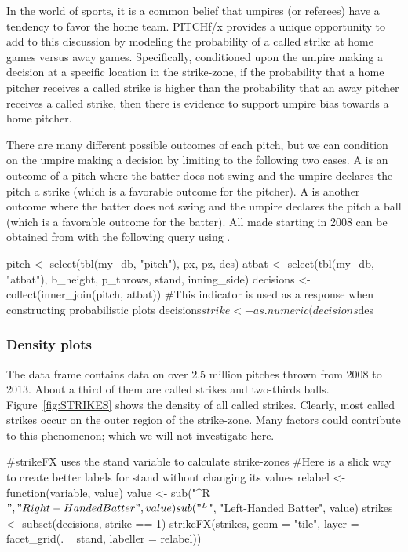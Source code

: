\documentclass[a4paper]{report}\usepackage[]{graphicx}\usepackage[]{color}
\begin{document}
\begin{article}
In the world of sports, it is a common belief that umpires (or referees)
have a tendency to favor the home team. PITCHf/x provides a unique
opportunity to add to this discussion by modeling the probability
of a called strike at home games versus away games. Specifically,
conditioned upon the umpire making a decision at a specific location
in the strike-zone, if the probability that a home pitcher receives
a called strike is higher than the probability that an away pitcher
receives a called strike, then there is evidence to support umpire
bias towards a home pitcher.

There are many different possible outcomes of each pitch, but we can
condition on the umpire making a decision by limiting to the following
two cases. A  is an outcome of a pitch where the
batter does not swing and the umpire declares the pitch a strike (which
is a favorable outcome for the pitcher). A  is another
outcome where the batter does not swing and the umpire declares the
pitch a ball (which is a favorable outcome for the batter). All 
made starting in 2008 can be obtained from  with the
following query using .

\begin{Schunk}
\begin{Sinput}
pitch <- select(tbl(my_db, "pitch"), px, pz, des)
atbat <- select(tbl(my_db, "atbat"), b_height, p_throws, stand, inning_side)
decisions <- collect(inner_join(pitch, atbat))
#This indicator is used as a response when constructing probabilistic plots
decisions$strike <- as.numeric(decisions$des %
\end{Sinput}
\end{Schunk}



\subsubsection{Density plots}

The  data frame contains data on over 2.5 million
pitches thrown from 2008 to 2013. About a third of them are called
strikes and two-thirds balls. Figure~\ref{fig:STRIKES} shows the
density of all called strikes. Clearly, most called strikes occur
on the outer region of the strike-zone. Many factors could contribute
to this phenomenon; which we will not investigate here.

\begin{Schunk}
\begin{Sinput}
#strikeFX uses the stand variable to calculate strike-zones 
#Here is a slick way to create better labels for stand without changing its values
relabel <- function(variable, value) { 
  value <- sub("^R$", "Right-Handed Batter", value) 
  sub("^L$", "Left-Handed Batter", value) 
}
strikes <- subset(decisions, strike == 1)
strikeFX(strikes, geom = "tile", layer = facet_grid(. ~ stand, labeller = relabel))
\end{Sinput}
\end{Schunk}



\end{article}
\end{document}
